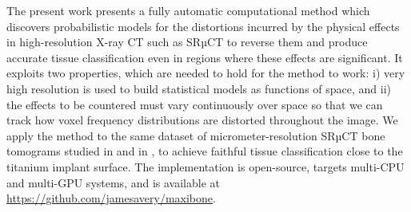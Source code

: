 The present work presents a fully automatic computational method which
discovers probabilistic models for the distortions incurred by the physical
effects in high-resolution X-ray CT such as SRµCT to reverse them and
produce accurate tissue classification even in regions where these effects are
significant. It exploits two properties, which are needed to hold for the
method to work: i) very high resolution is used to build statistical models as
functions of space, and ii) the effects to be countered must vary continuously
over space so that we can track how voxel frequency distributions are distorted
throughout the image. We apply the method to the same dataset of
micrometer-resolution SRµCT bone tomograms studied in \cite{torsten2018}
and in \cite{sporring}, to achieve faithful tissue classification close to the
titanium implant surface. The implementation is open-source, targets multi-CPU
and multi-GPU systems, and is available at
\href{https://github.com/jamesavery/maxibone}
{https://github.com/jamesavery/maxibone}.

